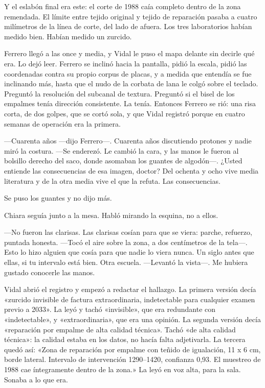 Y el eslabón final era este: el corte de 1988 caía completo dentro de la zona remendada. El límite entre tejido original y tejido de reparación pasaba a cuatro milímetros de la línea de corte, del lado de afuera. Los tres laboratorios habían medido bien. Habían medido un zurcido.

Ferrero llegó a las once y media, y Vidal le puso el mapa delante sin decirle qué era. Lo dejó leer. Ferrero se inclinó hacia la pantalla, pidió la escala, pidió las coordenadas contra su propio corpus de placas, y a medida que entendía se fue inclinando más, hasta que el nudo de la corbata de lana le colgó sobre el teclado. Preguntó la resolución del subcanal de textura. Preguntó si el bisel de los empalmes tenía dirección consistente. La tenía. Entonces Ferrero se rió: una risa corta, de dos golpes, que se cortó sola, y que Vidal registró porque en cuatro semanas de operación era la primera.

---Cuarenta años ---dijo Ferrero---. Cuarenta años discutiendo protones y nadie miró la costura. ---Se enderezó. Le cambió la cara, y las manos le fueron al bolsillo derecho del saco, donde asomaban los guantes de algodón---. ¿Usted entiende las consecuencias de esa imagen, doctor? Del ochenta y ocho vive media literatura y de la otra media vive el que la refuta. Las consecuencias.

Se puso los guantes y no dijo más.

Chiara seguía junto a la mesa. Habló mirando la esquina, no a ellos.

---No fueron las clarisas. Las clarisas cosían para que se viera: parche, refuerzo, puntada honesta. ---Tocó el aire sobre la zona, a dos centímetros de la tela---. Esto lo hizo alguien que cosía para que nadie lo viera nunca. Un siglo antes que ellas, si tu intervalo está bien. Otra escuela. ---Levantó la vista---. Me hubiera gustado conocerle las manos.

Vidal abrió el registro y empezó a redactar el hallazgo. La primera versión decía «zurcido invisible de factura extraordinaria, indetectable para cualquier examen previo a 2033». La leyó y tachó «invisible», que era redundante con «indetectable», y «extraordinaria», que era una opinión. La segunda versión decía «reparación por empalme de alta calidad técnica». Tachó «de alta calidad técnica»: la calidad estaba en los datos, no hacía falta adjetivarla. La tercera quedó así: «Zona de reparación por empalme con teñido de igualación, 11 x 6 cm, borde lateral. Intervalo de intervención 1290--1420, confianza 0,93. El muestreo de 1988 cae íntegramente dentro de la zona.» La leyó en voz alta, para la sala. Sonaba a lo que era.

